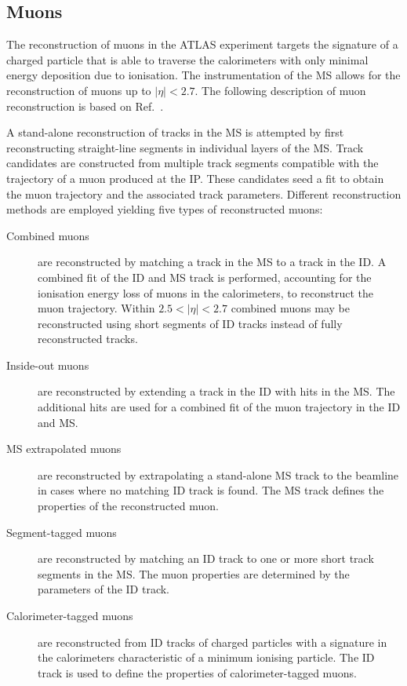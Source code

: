 \subsection{Muons}%
\label{sec:muon_rec}

The reconstruction of muons in the ATLAS experiment targets the signature of a
charged particle that is able to traverse the calorimeters with only minimal
energy deposition due to ionisation. The instrumentation of the MS allows for
the reconstruction of muons up to $|\eta| < 2.7$. The following description of
muon reconstruction is based on Ref.~\cite{MUON-2018-03}.

A stand-alone reconstruction of tracks in the MS is attempted by first
reconstructing straight-line segments in individual layers of the MS. Track
candidates are constructed from multiple track segments compatible with the
trajectory of a muon produced at the IP. These candidates seed a
fit to obtain the muon trajectory and the associated track parameters. Different
reconstruction methods are employed yielding five types of reconstructed muons:
\begin{description}

\item[Combined muons] are reconstructed by matching a track in the MS to a track
  in the ID. A combined fit of the ID and MS track is performed, accounting for
  the ionisation energy loss of muons in the calorimeters, to reconstruct the
  muon trajectory. Within $2.5 < |\eta| < 2.7$ combined muons may be
  reconstructed using short segments of ID tracks instead of fully reconstructed
  tracks.

\item[Inside-out muons] are reconstructed by extending a track in the ID with
  hits in the MS. The additional hits are used for a combined fit of the muon
  trajectory in the ID and MS.

\item[MS extrapolated muons] are reconstructed by extrapolating a stand-alone MS
  track to the beamline in cases where no matching ID track is found. The MS
  track defines the properties of the reconstructed muon. %

\item[Segment-tagged muons] are reconstructed by matching an ID track to one or
  more short track segments in the MS. The muon properties are determined by the
  parameters of the ID track.

\item[Calorimeter-tagged muons] are reconstructed from ID tracks of charged
  particles with a signature in the calorimeters characteristic of a minimum
  ionising particle. The ID track is used to define the properties of
  calorimeter-tagged muons.

\end{description}
